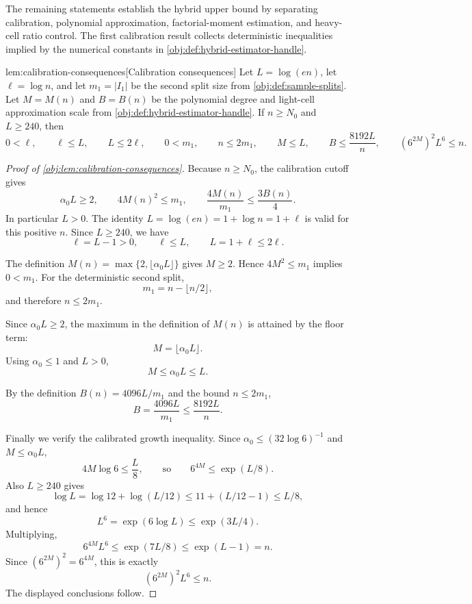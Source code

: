 \documentclass[11pt]{article}
\begin{document}
The remaining statements establish the hybrid upper bound by separating calibration, polynomial approximation, factorial-moment estimation, and heavy-cell ratio control. The first calibration result collects deterministic inequalities implied by the numerical constants in \cref{obj:def:hybrid-estimator-handle}.

\begin{lemmav}{lem:calibration-consequences}[Calibration consequences]
Let \(L=\log(en)\), let \(\ell=\log n\), and let \(m_1=|I_1|\) be the second split size from \cref{obj:def:sample-splits}. Let \(M=M(n)\) and \(B=B(n)\) be the polynomial degree and light-cell approximation scale from \cref{obj:def:hybrid-estimator-handle}. If \(n\ge N_0\) and \(L\ge240\), then
\[
0<\ell,\qquad
\ell\le L,\qquad
L\le2\ell,\qquad
0<m_1,\qquad
n\le2m_1,\qquad
M\le L,\qquad
B\le\frac{8192L}{n},\qquad
(6^{2M})^2L^6\le n .
\]
\end{lemmav}

\begin{proof}[Proof of \cref{obj:lem:calibration-consequences}]
Because \(n\ge N_0\), the calibration cutoff gives
\[
\alpha_0L\ge2,\qquad
4M(n)^2\le m_1,\qquad
\frac{4M(n)}{m_1}\le \frac{3B(n)}4.
\]
In particular \(L>0\). The identity \(L=\log(en)=1+\log n=1+\ell\) is valid for this positive \(n\). Since \(L\ge240\), we have
\[
\ell=L-1>0,\qquad \ell\le L,\qquad L=1+\ell\le2\ell. %
\]

The definition \(M(n)=\max\{2,\lfloor\alpha_0L\rfloor\}\) gives \(M\ge2\). Hence \(4M^2\le m_1\) implies \(0<m_1\). For the deterministic second split,
\[
m_1=n-\lfloor n/2\rfloor,
\]
and therefore \(n\le2m_1\). %

Since \(\alpha_0L\ge2\), the maximum in the definition of \(M(n)\) is attained by the floor term:
\[
M=\lfloor\alpha_0L\rfloor.
\]
Using \(\alpha_0\le1\) and \(L>0\),
\[
M\le \alpha_0L\le L. %
\]

By the definition \(B(n)=4096L/m_1\) and the bound \(n\le2m_1\),
\[
B=\frac{4096L}{m_1}
\le
\frac{8192L}{n}. %
\]

Finally we verify the calibrated growth inequality. Since \(\alpha_0\le(32\log6)^{-1}\) and \(M\le\alpha_0L\),
\[
4M\log6\le \frac{L}{8},
\qquad\text{so}\qquad
6^{4M}\le \exp(L/8).
\]
Also \(L\ge240\) gives
\[
\log L=\log 12+\log(L/12)
\le 11+(L/12-1)\le L/8,
\]
and hence
\[
L^6=\exp(6\log L)\le \exp(3L/4).
\]
Multiplying,
\[
6^{4M}L^6\le \exp(7L/8)\le \exp(L-1)=n.
\]
Since \((6^{2M})^2=6^{4M}\), this is exactly
\[
(6^{2M})^2L^6\le n. %
\]
The displayed conclusions follow. %
\end{proof}
\end{document}
